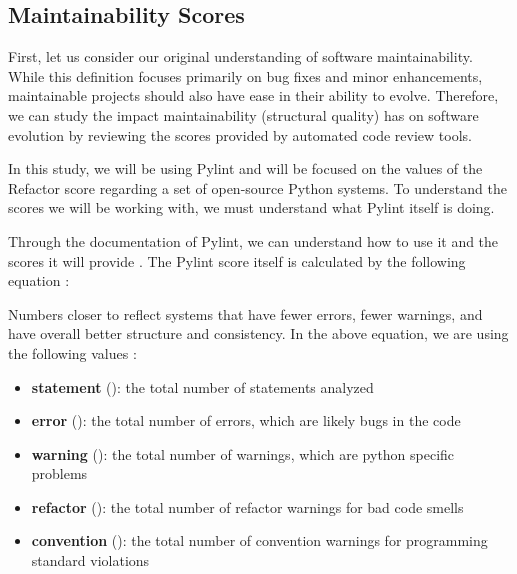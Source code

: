 \subsection{Maintainability Scores} \label{sectionMaintainabilityScores}



First, let us consider our original understanding of software maintainability. While this definition focuses primarily on bug fixes and minor enhancements, maintainable projects should also have ease in their ability to evolve. Therefore, we can study the impact maintainability (structural quality) has on software evolution by reviewing the scores provided by automated code review tools.

In this study, we will be using Pylint and will be focused on the values of the Refactor score regarding a set of open-source Python systems. To understand the scores we will be working with, we must understand what Pylint itself is doing. 

Through the documentation of Pylint, we can understand how to use it and the scores it will provide \cite{pylint:main}. The Pylint score itself is calculated by the following equation \cite{pylint:score}:

\vspace{0.25cm}
\begin{center}
\end{center}
\vspace{0.25cm}

Numbers closer to  reflect systems that have fewer errors, fewer warnings, and have overall better structure and consistency. In the above equation, we are using the following values \cite{pylint:docs}:

\vspace{0.25cm}
\begin{itemize}
    \item \textbf{statement} (): the total number of statements analyzed
    \item \textbf{error} (): the total number of errors, which are likely bugs in the code
    \item \textbf{warning} (): the total number of warnings, which are python specific problems
    \item \textbf{refactor} (): the total number of refactor warnings for bad code smells
    \item \textbf{convention} (): the total number of convention warnings for programming standard violations
\end{itemize}
\vspace{0.25cm}

